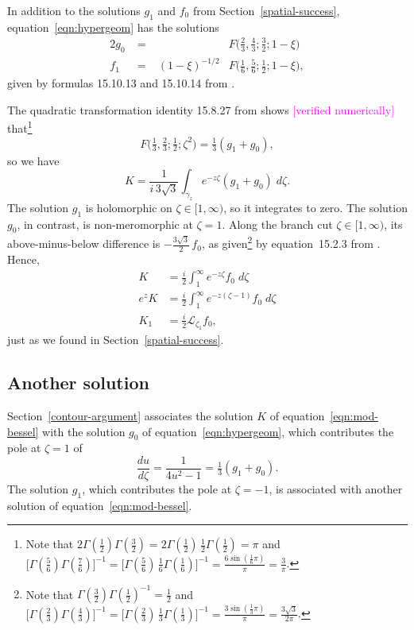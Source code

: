 \documentclass{article}
\theoremstyle{plain}
\newcommand{\laplace}{\mathcal{L}}
\begin{document}
In addition to the solutions $g_1$ and $f_0$ from Section~\ref{spatial-success}, equation~\ref{eqn:hypergeom} has the solutions
\begin{alignat*}{2}
g_0 &\;=\;& & F\big(\tfrac{2}{3}, \tfrac{4}{3}; \tfrac{3}{2}; 1-\xi\big) \\
f_1 &\;=\;& (1-\xi)^{-1/2} & F\big(\tfrac{1}{6}, \tfrac{5}{6}; \tfrac{1}{2}; 1-\xi\big),
\end{alignat*}
given by formulas 15.10.13 and 15.10.14 from \cite{dlmf}.

The quadratic transformation identity 15.8.27 from \cite{dlmf} shows \textcolor{magenta}{[verified numerically]} that\footnote{Note that $2\Gamma(\tfrac{1}{2})\Gamma(\tfrac{3}{2}) = 2\Gamma(\tfrac{1}{2})\,\tfrac{1}{2}\Gamma(\tfrac{1}{2}) = \pi$ and $\big[\Gamma(\tfrac{5}{6})\Gamma(\tfrac{7}{6})\big]^{-1} = \big[\Gamma(\tfrac{5}{6})\,\tfrac{1}{6}\Gamma(\tfrac{1}{6})\big]^{-1} = \frac{6\sin(\tfrac{1}{6} \pi)}{\pi} = \frac{3}{\pi}$.}
\[ F\big(\tfrac{1}{3}, \tfrac{2}{3}; \tfrac{1}{2}; \zeta^2\big) = \tfrac{1}{3}(g_1 + g_0), \]
so we have
\[ K = \frac{1}{i\,3\sqrt{3}} \int_{\gamma_z} e^{-z\zeta} (g_1 + g_0)\;d\zeta. \]
The solution $g_1$ is holomorphic on $\zeta \in [1, \infty)$, so it integrates to zero. The solution $g_0$, in contrast, is non-meromorphic at $\zeta = 1$. Along the branch cut $\zeta \in [1, \infty)$, its above-minus-below difference is $-\tfrac{3\sqrt{3}}{2}\,f_0$,
as given\footnote{Note that $\Gamma(\tfrac{3}{2}) \Gamma(\tfrac{1}{2})^{-1} = \tfrac{1}{2}$ and $\big[\Gamma(\tfrac{2}{3})\Gamma(\tfrac{4}{3})\big]^{-1} = \big[\Gamma(\tfrac{2}{3})\,\tfrac{1}{3}\Gamma(\tfrac{1}{3})\big]^{-1} = \frac{3\sin(\tfrac{1}{3} \pi)}{\pi} = \frac{3\sqrt{3}}{2\pi}$.} by equation~15.2.3 from \cite{dlmf}.
Hence,
\begin{align*}
K & = \frac{i}{2} \int^\infty_1 e^{-z\zeta} f_0\;d\zeta \\
e^z K & = \frac{i}{2} \int^\infty_1 e^{-z(\zeta - 1)} f_0\;d\zeta \\
K_1 & = \tfrac{i}{2} \laplace_{\zeta_1} f_0,
\end{align*}
just as we found in Section~\ref{spatial-success}.
\subsection{Another solution}
Section~\ref{contour-argument} associates the solution $K$ of equation~\ref{eqn:mod-bessel} with the solution $g_0$ of equation~\ref{eqn:hypergeom}, which contributes the pole at $\zeta = 1$ of
\[ \frac{du}{d\zeta} = \frac{1}{4u^2 - 1} = \tfrac{1}{3}(g_1 + g_0). \]
The solution $g_1$, which contributes the pole at $\zeta = -1$, is associated with another solution of equation~\ref{eqn:mod-bessel}.
\end{document}
